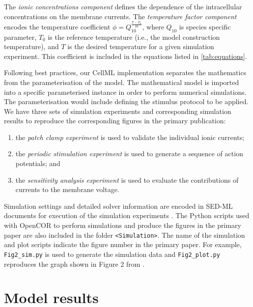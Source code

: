 \documentclass[fleqn,10pt]{physiome}
\begin{document}
The \emph{ionic concentrations component} defines the dependence of the intracellular concentrations on the membrane currents. The  \emph{temperature factor component} encodes the temperature coefficient $\phi=Q_{10}^{\frac{T-T_0}{10}}$, where $Q_{10}$ is species specific parameter, $T_{0}$ is the reference temperature (i.e., the model construction temperature), and $T$ is the desired temperature for a given simulation experiment. This coefficient is included in the equations listed in \autoref{tab:equations}.

Following best practices, our CellML implementation separates the mathematics from the parameterisation of the model. The mathematical model is imported into a specific parameterised instance in order to perform numerical simulations. The parameterisation would include defining the stimulus protocol to be applied. We have three sets of simulation experiments and corresponding simulation results to reproduce the corresponding figures in the primary publication: 
\begin{enumerate}[noitemsep] 
\item the \emph{patch clamp experiment} is used to validate the individual ionic currents;
\item the \emph{periodic stimulation experiment} is used to generate a sequence of action potentials; and
\item the \emph{sensitivity analysis experiment} is used to evaluate the contributions of currents to the membrane voltage.
\end{enumerate}

Simulation settings and detailed solver information are encoded in SED-ML documents for execution of the simulation experiments \citep{waltemath_reproducible_2011}. The Python scripts used with OpenCOR \citep{garny_opencor_2015} to perform simulations and produce the figures in the primary paper are also included in the folder \texttt{<Simulation>}. The name of the simulation and plot scripts indicate the figure number in the primary paper. For example, \texttt{Fig2\_sim.py} is used to generate the simulation data and \texttt{Fig2\_plot.py} reproduces the graph shown in Figure 2 from \citet{poh2012quantitative}.

\section{Model results}
\label{sed:modelResults}
\end{document}

